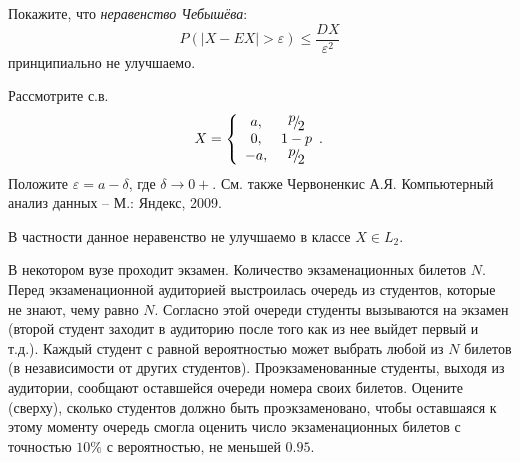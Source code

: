 \begin{problem}
Покажите, что \textit{неравенство Чебышёва}:
\[P\left(\left|X-EX\right|>\varepsilon \right)\le \frac{DX}{\varepsilon ^{2} } \] 
принципиально не улучшаемо.

\begin{ordre} 
Рассмотрите с.в. 
\[X=\left\{\begin{array}{cc} {a,} & {{\raise0.7ex\hbox{$ p $}\!\mathord{\left/ {\vphantom {p 2}} \right. \kern-\nulldelimiterspace}\!\lower0.7ex\hbox{$ 2 $}} } \\ {0,} & {1-p} \\ {-a,} & {{\raise0.7ex\hbox{$ p $}\!\mathord{\left/ {\vphantom {p 2}} \right. \kern-\nulldelimiterspace}\!\lower0.7ex\hbox{$ 2 $}} } \end{array}.\right.\] 
Положите $\varepsilon =a-\delta $, где $\delta \to 0+$. См. также Червоненкис А.Я. Компьютерный анализ данных -- М.: Яндекс, 2009. 
\end{ordre}

\begin{remark}
В частности данное неравенство не улучшаемо в классе $X \in L_2$. 
\end{remark}

\end{problem}

\begin{problem}
В некотором вузе проходит экзамен. Количество экзаменационных билетов $N$. Перед экзаменационной аудиторией выстроилась очередь из 
студентов, которые не знают, чему равно $N$. Согласно этой очереди студенты вызываются на экзамен (второй студент заходит в аудиторию 
после того как из нее выйдет первый и т.д.). Каждый студент с равной вероятностью может выбрать любой из $N$ билетов (в независимости 
от других студентов). Проэкзаменованные студенты, выходя из аудитории, сообщают оставшейся очереди номера своих билетов. 
Оцените (сверху), сколько студентов должно быть проэкзаменовано, чтобы оставшаяся к этому моменту очередь смогла оценить число 
экзаменационных билетов с точностью $10\%$ с вероятностью, не меньшей $0.95$. 
\end{problem}

